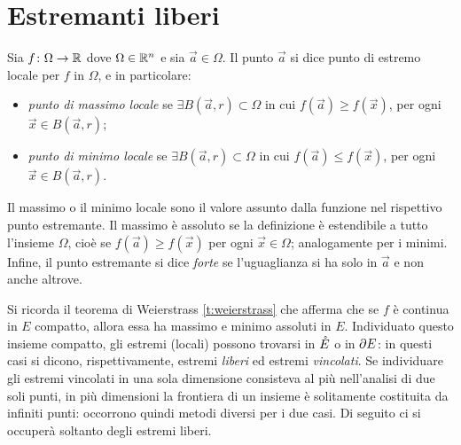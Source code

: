 \section{Estremanti liberi}
\begin{definizione}
Sia $f\colon\Omega\to\mathbb{R}$ dove $\Omega\in\mathbb{R}^n$ e sia $\vec a\in\Omega$. Il punto $\vec a$ si dice punto di estremo locale per $f$ in $\Omega$, e in particolare:
\begin{itemize}
\item \emph{punto di massimo locale} se $\exists B(\vec a,r)\subset\Omega$ in cui $f(\vec a)\geq f(\vec x)$, per ogni $\vec x\in B(\vec a,r)$;
\item \emph{punto di minimo locale} se $\exists B(\vec a,r)\subset\Omega$ in cui $f(\vec a)\leq f(\vec x)$, per ogni $\vec x\in B(\vec a,r)$.
\end{itemize}
\end{definizione}
Il massimo o il minimo locale sono il valore assunto dalla funzione nel rispettivo punto estremante. Il massimo è assoluto se la definizione è estendibile a tutto l'insieme $\Omega$, cioè se $f(\vec a)\geq f(\vec x)$ per ogni $\vec x\in\Omega$; analogamente per i minimi.
Infine, il punto estremante si dice \emph{forte} se l'uguaglianza si ha solo in $\vec a$ e non anche altrove.

Si ricorda il teorema di Weierstrass \ref{t:weierstrass} che afferma che se $f$ è continua in $E$ compatto, allora essa ha massimo e minimo assoluti in $E$. Individuato questo insieme compatto, gli estremi (locali) possono trovarsi in $\mathring{E}$ o in $\partial E$: in questi casi si dicono, rispettivamente, estremi \emph{liberi} ed estremi \emph{vincolati}. Se individuare gli estremi vincolati in una sola dimensione consisteva al più nell'analisi di due soli punti, in più dimensioni la frontiera di un insieme è solitamente costituita da infiniti punti: occorrono quindi metodi diversi per i due casi.
Di seguito ci si occuperà soltanto degli estremi liberi.

